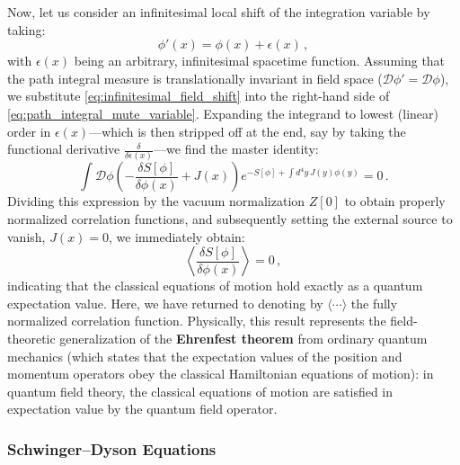 Now, let us consider an infinitesimal local shift of the integration variable by taking:
\begin{equation} \label{eq:infinitesimal_field_shift}
    \phi'(x) = \phi(x) + \epsilon(x) \, ,
\end{equation}
with \(\epsilon(x)\) being an arbitrary, infinitesimal spacetime function. Assuming that the path integral measure is translationally invariant in field space (\(\mathcal{D}\phi' = \mathcal{D}\phi\)), we substitute \eqref{eq:infinitesimal_field_shift} into the right-hand side of \eqref{eq:path_integral_mute_variable}. Expanding the integrand to lowest (linear) order in \(\epsilon(x)\)---which is then stripped off at the end, say by taking the functional derivative \(\frac{\delta}{\delta \epsilon(x)}\)---we find the master identity:
\begin{equation} \label{eq:master_dyson_identity}
    \int \mathcal{D}\phi \left( -\frac{\delta S[\phi]}{\delta \phi(x)} + J(x) \right) e^{-S[\phi] + \int d^4y \, J(y)\phi(y)} = 0 \, .
\end{equation}
Dividing this expression by the vacuum normalization \(Z[0]\) to obtain properly normalized correlation functions, and subsequently setting the external source to vanish, \(J(x) = 0\), we immediately obtain:
\begin{equation} \label{eq:quantum_ehrenfest}
    \left\langle \frac{\delta S[\phi]}{\delta \phi(x)} \right\rangle = 0 \, ,
\end{equation}
indicating that the classical equations of motion hold exactly as a quantum expectation value. Here, we have returned to denoting by \(\langle \cdots \rangle\) the fully normalized correlation function. Physically, this result represents the field-theoretic generalization of the \textbf{Ehrenfest theorem} from ordinary quantum mechanics (which states that the expectation values of the position and momentum operators obey the classical Hamiltonian equations of motion): in quantum field theory, the classical equations of motion are satisfied in expectation value by the quantum field operator.

\subsubsection{Schwinger--Dyson Equations}

